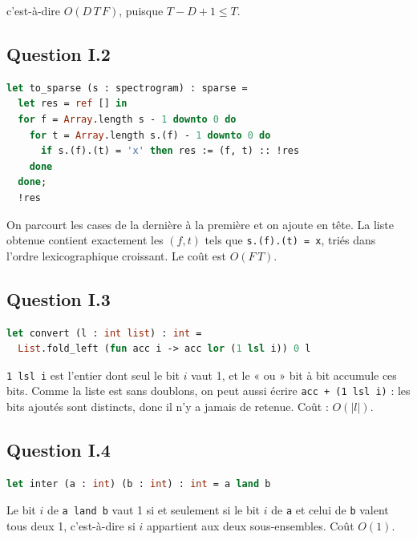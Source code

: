 \documentclass[11pt,a4paper]{article}
\newcommand{\equationajustee}[1]{%
  \sbox{\boiteequation}{$\displaystyle #1$}%
  \ifdim\wd\boiteequation>\linewidth
    \[\resizebox{\linewidth}{!}{\usebox{\boiteequation}}\]%
  \else
    \[#1\]%
  \fi}
\begin{document}
\equationajustee{\boxed{O\big(F\cdot D\cdot(T-D+1)\big)},}

c'est-à-dire \(O(D\,T\,F)\), puisque \(T-D+1\le T\).

\hypertarget{question-i.2}{%
\subsection{Question I.2}\label{question-i.2}}

\begin{lstlisting}[language=Caml]
let to_sparse (s : spectrogram) : sparse =
  let res = ref [] in
  for f = Array.length s - 1 downto 0 do
    for t = Array.length s.(f) - 1 downto 0 do
      if s.(f).(t) = 'x' then res := (f, t) :: !res
    done
  done;
  !res
\end{lstlisting}

On parcourt les cases de la dernière à la première et on ajoute en tête. La liste obtenue contient exactement les \((f,t)\) tels que \texttt{s.(f).(t)\ =\ \textquotesingle{}x\textquotesingle{}}, triés dans l'ordre lexicographique croissant. Le coût est \(O(F\,T)\).

\hypertarget{question-i.3}{%
\subsection{Question I.3}\label{question-i.3}}

\begin{lstlisting}[language=Caml]
let convert (l : int list) : int =
  List.fold_left (fun acc i -> acc lor (1 lsl i)) 0 l
\end{lstlisting}

\texttt{1\ lsl\ i} est l'entier dont seul le bit \(i\) vaut 1, et le « ou » bit à bit accumule ces bits. Comme la liste est sans doublons, on peut aussi écrire \texttt{acc\ +\ (1\ lsl\ i)} : les bits ajoutés sont distincts, donc il n'y a jamais de retenue. Coût : \(O(|l|)\).

\hypertarget{question-i.4}{%
\subsection{Question I.4}\label{question-i.4}}

\begin{lstlisting}[language=Caml]
let inter (a : int) (b : int) : int = a land b
\end{lstlisting}

Le bit \(i\) de \texttt{a\ land\ b} vaut 1 si et seulement si le bit \(i\) de \texttt{a} et celui de \texttt{b} valent tous deux 1, c'est-à-dire si \(i\) appartient aux deux sous-ensembles. Coût \(O(1)\).
\end{document}
